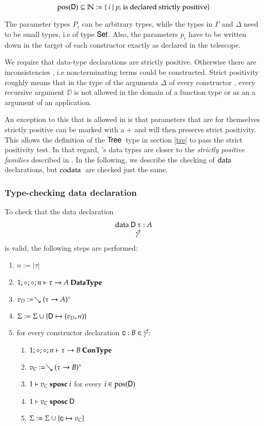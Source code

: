 \[\mbox{pos}(\mathsf{D}) \subseteq \mathbb{N} := \{ \: i \mid p_i \mbox{ is declared strictly positive} \}\]

The parameter types $P_i$ can be arbitrary types, while the types in $\Gamma$ and $\Delta$ need to be small types, i.e of type $\mathsf{Set}$. Also, the parameters $p_i$ have to be written down in the target of each constructor exactly as declared in the telescope.

We require that data-type declarations are strictly positive.
Otherwise there are inconsistencies \cite{paulinmohring93inductive}, i.e non-terminating terms could be constructed.
Strict positivity roughly means that in the type of the arguments $\Delta$ of every constructor , every recursive argument $\DD$ is not allowed in the domain of a function type or as an a argument of an application.

An exception to this that is allowed in \mugda is that parameters that are for themselves strictly positive can be marked with a $+$ and will then preserve strict positivity. 
This allows the definition of the $\mathsf{Tree}\:$ type in section \ref{tre} to pass the strict positivity test. In that regard, \mugda 's data types are closer to the \emph{strictly positive families} described in \cite{alti:cats07}.
In the following, we describe the checking of $\mathrm{data}\:$ declarations, but $\mathrm{codata}\:$ are checked just the same.

\newcommand{\sposc}[3]{#1\vdash#2\mbox{ \textbf{sposc} }#3}
\newcommand{\spos}[3]{#1\vdash#2\mbox{ \textbf{spos} }#3}

\subsubsection{Type-checking data declaration}


To check that the data declaration
\[\begin{array}{l}
\data \DD \: \tau : A \\
\spcx \vec{\gamma}
\end{array}
\]
is valid, the following steps are performed: 
\begin{enumerate}
\item
$ n := \vert\tau\vert $
\item
$1;\diamond;\diamond;n\vdash \tau \rightarrow A\:\mathbf{Data Type}$
\item
$v_D := \searrow (\tau \rightarrow A)^{\diamond}$
\item
$\Sigma := \Sigma \cup \{\mathsf{D} \mapsto (v_D,n)\}$
\item
for every constructor declaration $\mathsf{c} : B  \in \vec{\gamma}$:
\begin{enumerate} 
\item
$1;\diamond;\diamond;n\vdash\tau \rightarrow B\:\mathbf{Con Type}$
\item
$v_C := \searrow (\tau \rightarrow B)^{\diamond}$
\item
$\sposc{1}{v_C}{i}$ for every $i \in \mbox{pos}(\mathsf{D}) $ 
\item
$\sposc{1}{v_C}{\DD}$
\item
$\Sigma := \Sigma \cup \{\mathsf{c} \mapsto v_C\}$
\end{enumerate}
\end{enumerate}

